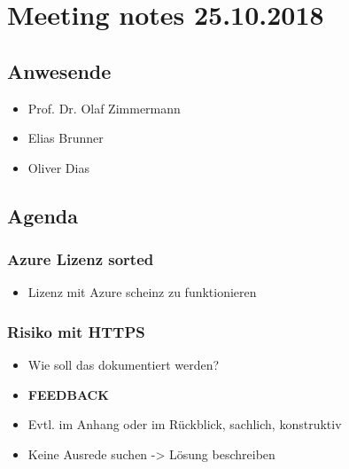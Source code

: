 \hypertarget{meeting-notes-25.10.2018}{%
\section*{Meeting notes 25.10.2018}\label{meeting-notes-25.10.2018}}

\hypertarget{anwesende}{%
\subsection*{Anwesende}\label{anwesende}}

\begin{itemize}

\item
  Prof. Dr. Olaf Zimmermann
\item
  Elias Brunner
\item
  Oliver Dias
\end{itemize}

\hypertarget{agenda}{%
\subsection*{Agenda}\label{agenda}}

\hypertarget{azure-lizenz-sorted}{%
\subsubsection*{Azure Lizenz sorted}\label{azure-lizenz-sorted}}

\begin{itemize}

\item
  Lizenz mit Azure scheinz zu funktionieren
\end{itemize}

\hypertarget{risiko-mit-https}{%
\subsubsection*{Risiko mit HTTPS}\label{risiko-mit-https}}

\begin{itemize}

\item
  Wie soll das dokumentiert werden? 
\item \textbf{FEEDBACK}
\item
  Evtl. im Anhang oder im Rückblick, sachlich, konstruktiv
\item
  Keine \grqq Ausrede\grqq{} suchen -\textgreater{} Lösung beschreiben
\end{itemize}

